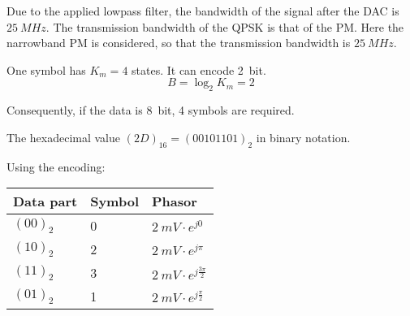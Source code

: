 \begin{solution}
	\begin{tasks}
		\task
		Due to the applied lowpass filter, the bandwidth of the signal after the DAC is $\SI{25}{MHz}$. The transmission bandwidth of the QPSK is that of the PM. Here the narrowband PM is considered, so that the transmission bandwidth is $\SI{25}{MHz}$.
		
		\task
		One symbol has $K_m = 4$ states. It can encode \SI{2}{bit}.
		\begin{equation*}
			B = \log_2 K_m = 2
		\end{equation*}
		
		Consequently, if the data is \SI{8}{bit}, 4 symbols are required.
		
		\task
		\begin{figure}[H]
			\centering
		\end{figure}
		
		\task
		The hexadecimal value $(2D)_{16} = (00101101)_{2}$ in binary notation.
		
		Using the encoding:
		\begin{table}[H]
			\centering
			\begin{tabular}{|l|l|l|}
				\hline
				Data part & Symbol & Phasor \\
				\hline
				\hline
				$(00)_2$ & 0 & $\SI{2}{mV} \cdot e^{j 0}$ \\
				\hline
				$(10)_2$ & 2 & $\SI{2}{mV} \cdot e^{j \pi}$ \\
				\hline
				$(11)_2$ & 3 & $\SI{2}{mV} \cdot e^{j \frac{3 \pi}{2}}$ \\
				\hline
				$(01)_2$ & 1 & $\SI{2}{mV} \cdot e^{j \frac{\pi}{2}}$ \\
				\hline
			\end{tabular}
		\end{table}
	

\end{tasks}
\end{solution}
